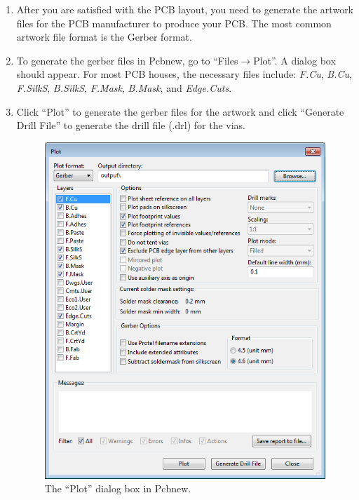\documentclass[12pt,letterpaper]{scrartcl}
\begin{document}
\begin{enumerate}
	\item After you are satisfied with the PCB layout, you need to generate the artwork files for the PCB manufacturer to produce your PCB. The most common artwork file format is the Gerber format. 
	
	\item To generate the gerber files in Pcbnew, go to ``Files$\rightarrow$Plot''. A dialog box should appear. For most PCB houses, the necessary files include: \emph{F.Cu}, \emph{B.Cu}, \emph{F.SilkS}, \emph{B.SilkS}, \emph{F.Mask}, \emph{B.Mask}, and \emph{Edge.Cuts}. 

	
	\item Click ``Plot'' to generate the gerber files for the artwork and click ``Generate Drill File'' to generate the drill file (.drl) for the vias. 
		\begin{figure}[hp]
			\centering
			\includegraphics[width=4.5in]{generate-gerber}
			\caption{The ``Plot'' dialog box in Pcbnew.}
			\label{fig:generate-gerber}
		\end{figure}
		
\end{enumerate}
\end{document}
